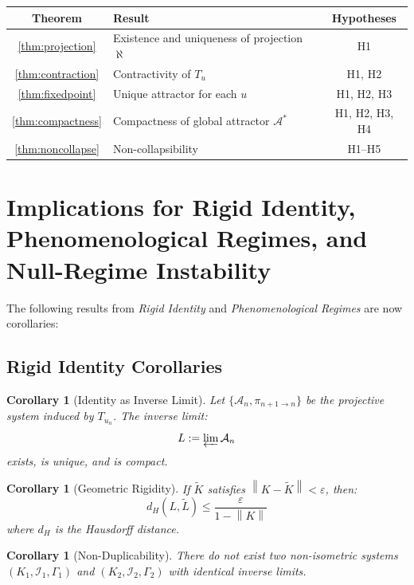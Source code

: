 \documentclass[11pt,a4paper]{article}
\theoremstyle{plain}
\newtheorem{corollary}[theorem]{Corollary}
\theoremstyle{definition}
\newcommand{\I}{\mathcal{I}}
\newcommand{\A}{\mathcal{A}}
\newcommand{\norm}[1]{\left\lVert #1 \right\rVert}
\begin{document}
\begin{center}
\begin{tabular}{|c|l|c|}
\hline
\textbf{Theorem} & \textbf{Result} & \textbf{Hypotheses} \\
\hline
\ref{thm:projection} & Existence and uniqueness of projection $\aleph$ & H1 \\
\ref{thm:contraction} & Contractivity of $T_u$ & H1, H2 \\
\ref{thm:fixedpoint} & Unique attractor for each $u$ & H1, H2, H3 \\
\ref{thm:compactness} & Compactness of global attractor $\A^*$ & H1, H2, H3, H4 \\
\ref{thm:noncollapse} & Non-collapsibility & H1--H5 \\
\hline
\end{tabular}
\end{center}

\section{Implications for Rigid Identity, Phenomenological Regimes, and Null-Regime Instability}

The following results from \textit{Rigid Identity} and \textit{Phenomenological Regimes} are now corollaries:

\subsection{Rigid Identity Corollaries}

\begin{corollary}[Identity as Inverse Limit]
Let $\{\A_n, \pi_{n+1 \to n}\}$ be the projective system induced by $T_{u_n}$. The inverse limit:
\[
L := \varprojlim \A_n
\]
exists, is unique, and is compact.
\end{corollary}

\begin{corollary}[Geometric Rigidity]
If $\tilde{K}$ satisfies $\norm{K - \tilde{K}} < \varepsilon$, then:
\[
d_H(L, \tilde{L}) \leq \frac{\varepsilon}{1 - \norm{K}}
\]
where $d_H$ is the Hausdorff distance.
\end{corollary}

\begin{corollary}[Non-Duplicability]
There do not exist two non-isometric systems $(K_1, \I_1, \Gamma_1)$ and $(K_2, \I_2, \Gamma_2)$ with identical inverse limits.
\end{corollary}
\end{document}
